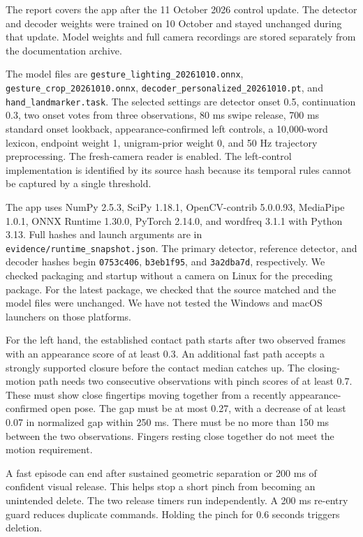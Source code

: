 The report covers the app after the 11 October 2026 control update. The detector and decoder weights were trained on 10 October and stayed unchanged during that update. Model weights and full camera recordings are stored separately from the documentation archive.

The model files are \nolinkurl{gesture_lighting_20261010.onnx}, \nolinkurl{gesture_crop_20261010.onnx}, \nolinkurl{decoder_personalized_20261010.pt}, and \nolinkurl{hand_landmarker.task}. The selected settings are detector onset 0.5, continuation 0.3, two onset votes from three observations, 80 ms swipe release, 700 ms standard onset lookback, appearance-confirmed left controls, a 10,000-word lexicon, endpoint weight 1, unigram-prior weight 0, and 50 Hz trajectory preprocessing. The fresh-camera reader is enabled. The left-control implementation is identified by its source hash because its temporal rules cannot be captured by a single threshold.

The app uses NumPy 2.5.3, SciPy 1.18.1, OpenCV-contrib 5.0.0.93, MediaPipe 1.0.1, ONNX Runtime 1.30.0, PyTorch 2.14.0, and wordfreq 3.1.1 with Python 3.13. Full hashes and launch arguments are in \nolinkurl{evidence/runtime_snapshot.json}. The primary detector, reference detector, and decoder hashes begin \texttt{0753c406}, \texttt{b3eb1f95}, and \texttt{3a2dba7d}, respectively. We checked packaging and startup without a camera on Linux for the preceding package. For the latest package, we checked that the source matched and the model files were unchanged. We have not tested the Windows and macOS launchers on those platforms.


For the left hand, the established contact path starts after two observed frames with an appearance score of at least 0.3. An additional fast path accepts a strongly supported closure before the contact median catches up. The closing-motion path needs two consecutive observations with pinch scores of at least 0.7. These must show close fingertips moving together from a recently appearance-confirmed open pose. The gap must be at most 0.27, with a decrease of at least 0.07 in normalized gap within 250 ms. There must be no more than 150 ms between the two observations. Fingers resting close together do not meet the motion requirement.

A fast episode can end after sustained geometric separation or 200 ms of confident visual release. This helps stop a short pinch from becoming an unintended delete. The two release timers run independently. A 200 ms re-entry guard reduces duplicate commands. Holding the pinch for 0.6 seconds triggers deletion.

